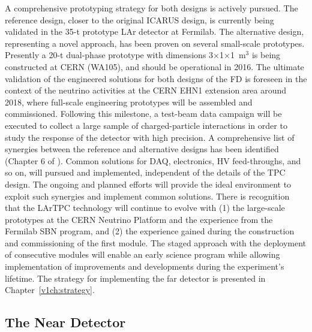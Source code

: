 A  comprehensive prototyping strategy for both designs is actively pursued.
The reference design, closer to the original ICARUS design, is currently being validated in the 35-t prototype 
LAr detector at Fermilab.  The alternative design, representing a novel approach, has been proven on several
small-scale prototypes. Presently
a 20-t dual-phase prototype with dimensions 3$\times$1$\times$1~m$^3$ is being constructed at CERN (WA105),  
and should be operational in 2016. 
The ultimate validation of the engineered solutions for both designs of the FD is foreseen in
the context of the neutrino activities at the CERN EHN1 extension area around 2018, 
where full-scale engineering prototypes will be 
assembled and commissioned. Following this milestone, a test-beam data 
campaign will be executed %
to collect a large sample of charged-particle interactions
in order to study the response of the detector with high precision.
A comprehensive list of synergies between the reference and alternative designs has been identified (Chapter 6 of \voldune). Common solutions for DAQ, electronics, HV feed-throughs, and so on, will pursued and implemented, independent of the details of the TPC design. The ongoing and planned efforts %
will
provide the ideal environment to exploit such synergies and implement common solutions.
There is recognition that the LArTPC technology will continue to evolve with (1) the large-scale prototypes at the CERN Neutrino Platform and the experience from the Fermilab SBN program, and (2) the experience gained during the construction and commissioning of the first  module. 
The staged approach with the deployment of consecutive modules will
enable an early science program while allowing implementation of improvements and developments  during the experiment's lifetime.
The strategy for implementing
the far detector is presented in Chapter~\ref{v1ch:strategy}.

\subsection{The Near Detector} %


